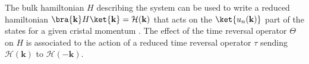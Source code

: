 The bulk hamiltonian $H$ describing the system can be used to write a reduced hamiltonian $\bra{\mathbf{k}} H \ket{\mathbf{k}} = \mathcal{H}(\mathbf{k})$ that acts on the $\ket{u_n(\mathbf{k})}$ part of the states for a given cristal momentum \cite{asboth_short_2016}. The effect of the time reversal operator $\Theta$ on $H$ is associated to the action of a reduced time reversal operator $\tau$ sending $\mathcal{H}(\mathbf{k})$ to $\mathcal{H}(-\mathbf{k})$\cite{asboth_short_2016}. 